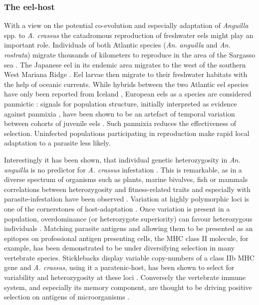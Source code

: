 \subsubsection{The eel-host}
\label{sec:eel-host}

With a view on the potential co-evolution and especially adaptation of
\textit{Anguilla} spp. to \textit{A. crassus} the catadromous
reproduction of freshwater eels might play an important
role. Individuals of both Atlantic species (\textit{An. anguilla} and
\textit{An. rostrata}) migrate thousands of kilometers to reproduce in
the area of the Sargasso sea \cite{pmid19779192}. The Japanese eel in
its endemic area migrates to the west of the southern West Mariana
Ridge \cite{pmid20735676}. Eel larvae then migrate to their freshwater
habitats with the help of oceanic currents. While hybrids between the
two Atlantic eel species have only been reported from Iceland
\cite{pmid21299662}, European eels as a species are considered
panmictic \cite{pmid20735687}: signals for population structure,
initially interpreted as evidence against panmixia
\cite{pmid11234011}, have been shown to be an artefact of temporal
variation between cohorts of juvenile eels \cite{pmid19417764,
  pmid21299662, pmid16024374}. Such panmixia reduces the effectiveness
of selection. Uninfected populations participating in reproduction
make rapid local adaptation to a parasite less likely.

Interestingly it has been shown, that individual genetic
heterozygosity in \textit{An. anguilla} is no predictor for
\textit{A. crassus} infestation \cite{pmid19840264}. This is
remarkable, as in a diverse spectrum of organisms such as plants,
marine bivalves, fish or mammals correlations between heterozygosity
and fitness-related traits and especially with parasite-infestation
have been observed \cite{pmid16262866,pmid18398424}. Variation at
highly polymorphic loci is one of the cornerstones of host-adaptation
\cite{pmid20078764}. Once variation is present in a population,
overdominance (or heterozygote superiority) can favour heterozygous
individuals \cite{pmid19129114,pmid17603099}. Matching parasite
antigens and allowing them to be presented as an epitopes on
professional antigen presenting cells, the MHC class II molecule, for
example, has been demonstrated to be under diversifying selection in
many vertebrate species. Sticklebacks display variable copy-numbers of
a class IIb MHC gene and \textit{A. crassus}, using it a
paratenic-host, has been shown to select for variability and
heterozygosity at these loci \cite{wegner_parasite_2003}. Conversely
the vertebrate immune system, and especially its memory component, are
thought to be driving positive selection on antigens of microorganisms
\cite{conway_measuring_2002}.

